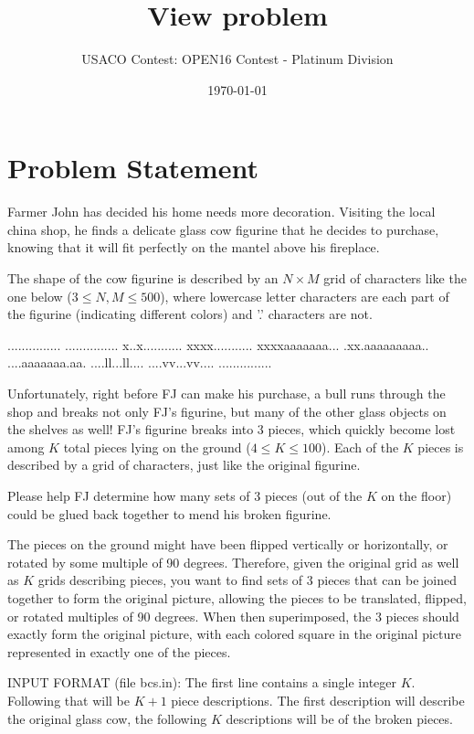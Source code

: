 \documentclass[12pt]{article}
\title{View problem}
\author{USACO Contest: OPEN16 Contest - Platinum Division}
\date{\today}
\begin{document}
\maketitle

\section*{Problem Statement}

Farmer John has decided his home needs more decoration.  Visiting the local
china shop, he finds a delicate glass cow figurine that he decides to purchase,
knowing that it will fit perfectly on the mantel above his fireplace.

The shape of the cow figurine is described by an $N \times M$ grid of characters
like the one below ($3 \leq N, M \leq 500$), where lowercase letter characters
are each part of the figurine (indicating different colors) and '.' characters
are not.


...............
...............
x..x...........
xxxx...........
xxxxaaaaaaa...
.xx.aaaaaaaaa..
....aaaaaaa.aa.
....ll...ll....
....vv...vv....
...............

Unfortunately, right before FJ can make his purchase, a bull runs through the
shop  and breaks not only FJ's figurine, but many of the other glass objects on
the shelves as well!  FJ's figurine breaks into 3 pieces, which quickly become
lost  among $K$ total pieces lying on the ground ($4 \leq K \leq 100$).  Each of
the $K$ pieces is described by a grid of characters, just like the original
figurine.

Please help FJ determine how many sets of 3 pieces (out of the $K$ on the floor)
could be glued back together to mend his broken figurine.  

The pieces on the ground might have been flipped vertically or horizontally, or
rotated by some multiple of 90 degrees. Therefore, given the original grid as
well as $K$ grids describing pieces, you want to find sets of 3 pieces that can
be joined together to form the original picture, allowing the pieces to be
translated, flipped, or rotated multiples of 90 degrees.  When then
superimposed, the 3 pieces should exactly form the original picture, with each
colored square in the original picture represented in exactly one of the pieces.

INPUT FORMAT (file bcs.in):
The first line contains a single integer $K$. Following that will be $K + 1$
piece descriptions.  The first description will describe the original glass cow,
the following $K$ descriptions will be of the broken pieces.
\end{document}
